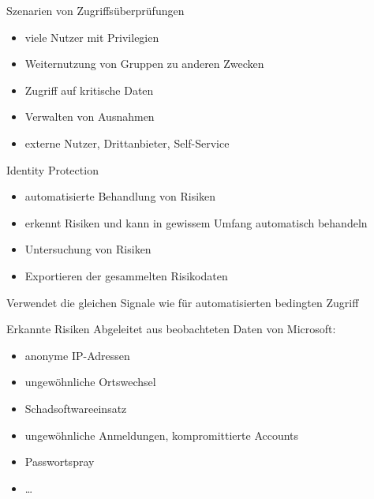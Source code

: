 \begin{flashcard}[Definition]{Szenarien von Zugriffsüberprüfungen}
  \begin{itemize}
    \item viele Nutzer mit Privilegien
    \item Weiternutzung von Gruppen zu anderen Zwecken
    \item Zugriff auf kritische Daten
    \item Verwalten von Ausnahmen
    \item externe Nutzer, Drittanbieter, Self-Service
  \end{itemize}
\end{flashcard}

\begin{flashcard}[Definition]{Identity Protection}
  \begin{itemize}
    \item automatisierte Behandlung von Risiken
    \item erkennt Risiken und kann in gewissem Umfang automatisch behandeln
    \item Untersuchung von Risiken
    \item Exportieren der gesammelten Risikodaten
  \end{itemize}
  Verwendet die gleichen Signale wie für automatisierten bedingten Zugriff
\end{flashcard}

\begin{flashcard}[Definition]{Erkannte Risiken}
  Abgeleitet aus beobachteten Daten von Microsoft:
  \begin{itemize}
    \item anonyme IP-Adressen
    \item ungewöhnliche Ortswechsel
    \item Schadsoftwareeinsatz
    \item ungewöhnliche Anmeldungen, kompromittierte Accounts
    \item Passwortspray
    \item \ldots
  \end{itemize}
\end{flashcard}

